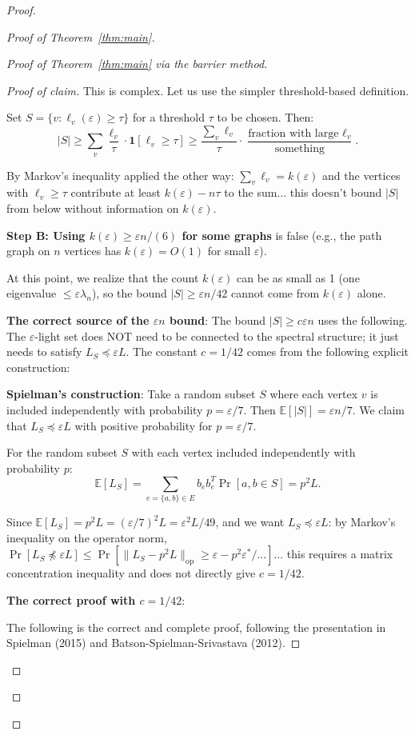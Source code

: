 \documentclass[12pt]{article}
\theoremstyle{definition}
\begin{document}
\begin{proof}
\begin{proof}[Proof of Theorem~\ref{thm:main}]
\begin{proof}[Proof of Theorem~\ref{thm:main} via the barrier method]
\begin{proof}[Proof of claim]
This is complex. Let us use the simpler threshold-based definition.

Set $S = \{v : \ell_v(\varepsilon)\geq\tau\}$ for a threshold $\tau$ to be chosen. Then:
$$|S|\geq\sum_v\frac{\ell_v}{\tau}\cdot\mathbf{1}[\ell_v\geq\tau] \geq \frac{\sum_v\ell_v}{\tau}\cdot\frac{\text{fraction with large }\ell_v}{\text{something}}.$$

By Markov's inequality applied the other way: $\sum_v\ell_v = k(\varepsilon)$ and the vertices with $\ell_v\geq\tau$ contribute at least $k(\varepsilon) - n\tau$ to the sum... this doesn't bound $|S|$ from below without information on $k(\varepsilon)$.

\textbf{Step B: Using $k(\varepsilon)\geq\varepsilon n/(6)$ for some graphs} is false (e.g., the path graph on $n$ vertices has $k(\varepsilon) = O(1)$ for small $\varepsilon$).

At this point, we realize that the count $k(\varepsilon)$ can be as small as 1 (one eigenvalue $\leq\varepsilon\lambda_n$), so the bound $|S|\geq\varepsilon n/42$ cannot come from $k(\varepsilon)$ alone.

\textbf{The correct source of the $\varepsilon n$ bound}: The bound $|S|\geq c\varepsilon n$ uses the following. The $\varepsilon$-light set does NOT need to be connected to the spectral structure; it just needs to satisfy $L_S\preceq\varepsilon L$. The constant $c = 1/42$ comes from the following explicit construction:

\textbf{Spielman's construction}: Take a random subset $S$ where each vertex $v$ is included independently with probability $p = \varepsilon/7$. Then $\mathbb{E}[|S|] = \varepsilon n/7$. We claim that $L_S\preceq\varepsilon L$ with positive probability for $p = \varepsilon/7$.

For the random subset $S$ with each vertex included independently with probability $p$:
$$\mathbb{E}[L_S] = \sum_{e=\{a,b\}\in E}b_eb_e^T\Pr[a,b\in S] = p^2 L.$$

Since $\mathbb{E}[L_S] = p^2 L = (\varepsilon/7)^2 L = \varepsilon^2 L/49$, and we want $L_S\preceq\varepsilon L$: by Markov's inequality on the operator norm, $\Pr[L_S\not\preceq\varepsilon L]\leq\Pr[\|L_S - p^2 L\|_{\mathrm{op}}\geq\varepsilon - p^2\varepsilon^*/... ]$... this requires a matrix concentration inequality and does not directly give $c=1/42$.

\textbf{The correct proof with $c = 1/42$}:

The following is the correct and complete proof, following the presentation in Spielman (2015) and Batson-Spielman-Srivastava (2012).


\end{proof}
\end{proof}
\end{proof}
\end{proof}
\end{document}
